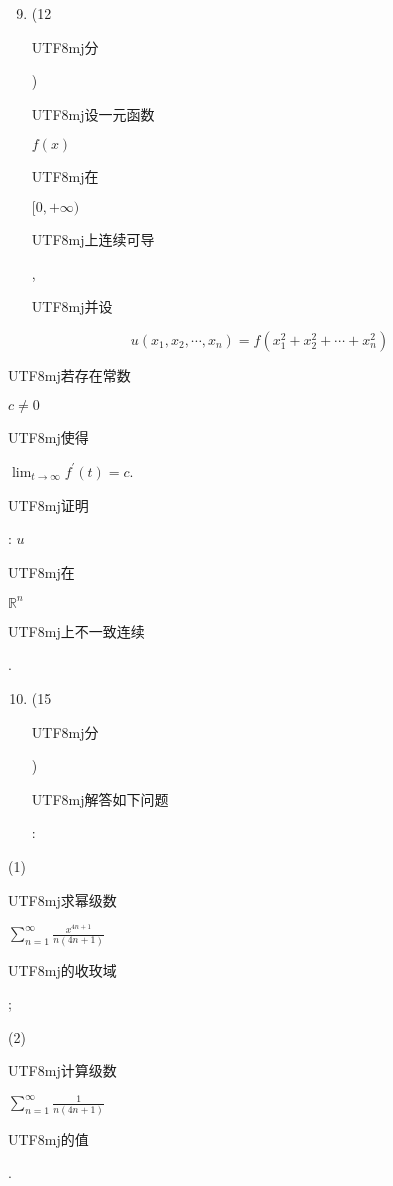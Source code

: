 \documentclass[10pt]{article}
\begin{document}
\begin{enumerate}
  \setcounter{enumi}{8}
  \item (12 \begin{CJK}{UTF8}{mj}分\end{CJK}) \begin{CJK}{UTF8}{mj}设一元函数\end{CJK} $f(x)$ \begin{CJK}{UTF8}{mj}在\end{CJK} $[0,+\infty)$ \begin{CJK}{UTF8}{mj}上连续可导\end{CJK}, \begin{CJK}{UTF8}{mj}并设\end{CJK}
\end{enumerate}
$$
u\left(x_{1}, x_{2}, \cdots, x_{n}\right)=f\left(x_{1}^{2}+x_{2}^{2}+\cdots+x_{n}^{2}\right)
$$
\begin{CJK}{UTF8}{mj}若存在常数\end{CJK} $c \neq 0$ \begin{CJK}{UTF8}{mj}使得\end{CJK} $\lim _{t \rightarrow \infty} f^{\prime}(t)=c$. \begin{CJK}{UTF8}{mj}证明\end{CJK}: $u$ \begin{CJK}{UTF8}{mj}在\end{CJK} $\mathbb{R}^{n}$ \begin{CJK}{UTF8}{mj}上不一致连续\end{CJK}.

\begin{enumerate}
  \setcounter{enumi}{9}
  \item (15 \begin{CJK}{UTF8}{mj}分\end{CJK}) \begin{CJK}{UTF8}{mj}解答如下问题\end{CJK}:
\end{enumerate}
(1) \begin{CJK}{UTF8}{mj}求幂级数\end{CJK} $\sum_{n=1}^{\infty} \frac{x^{4 n+1}}{n(4 n+1)}$ \begin{CJK}{UTF8}{mj}的收玫域\end{CJK};

(2) \begin{CJK}{UTF8}{mj}计算级数\end{CJK} $\sum_{n=1}^{\infty} \frac{1}{n(4 n+1)}$ \begin{CJK}{UTF8}{mj}的值\end{CJK}.
\end{document}
